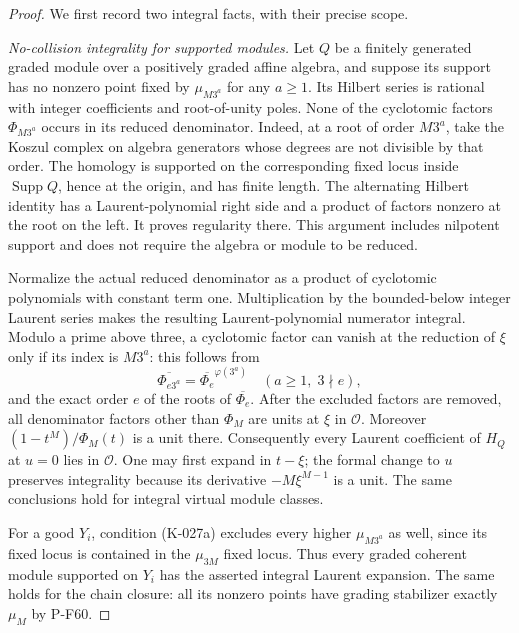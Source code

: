 \begin{proof}
We first record two integral facts, with their precise scope.

\emph{No-collision integrality for supported modules.}
Let $Q$ be a finitely generated graded module over a positively
graded affine algebra, and suppose its support has no nonzero point
fixed by $\mu_{M3^a}$ for any $a\ge1$.  Its Hilbert series is rational
with integer coefficients and root-of-unity poles.  None of the
cyclotomic factors $\Phi_{M3^a}$ occurs in its reduced denominator.
Indeed, at a root of order $M3^a$, take the Koszul complex on algebra
generators whose degrees are not divisible by that order.  The
homology is supported on the corresponding fixed locus inside
$\operatorname{Supp}Q$, hence at the origin, and has finite length.
The alternating Hilbert identity has a Laurent-polynomial right side and a
product of factors nonzero at the root on the left.  It proves
regularity there.  This argument includes nilpotent support and does
not require the algebra or module to be reduced.

Normalize the actual reduced denominator as a product of cyclotomic
polynomials with constant term one.  Multiplication by the bounded-below
integer Laurent series makes the resulting Laurent-polynomial numerator
integral.
Modulo a prime above three, a cyclotomic factor can vanish at the
reduction of $\xi$ only if its index is $M3^a$: this follows from
\[
 \overline{\Phi_{e3^a}}
   =\overline{\Phi_e}^{\varphi(3^a)}\quad(a\ge1,\;3\nmid e),
\]
and the exact order $e$ of the roots of $\overline{\Phi_e}$.
After the excluded factors are removed, all denominator factors
other than $\Phi_M$ are units at $\xi$ in $\mathcal O$.
Moreover $(1-t^M)/\Phi_M(t)$ is a unit there.  Consequently every
Laurent coefficient of $H_Q$ at $u=0$ lies in $\mathcal O$.
One may first expand in $t-\xi$; the formal change to $u$ preserves
integrality because its derivative $-M\xi^{M-1}$ is a unit.
The same conclusions hold for integral virtual module classes.

For a good $Y_i$, condition (K-027a) excludes every higher
$\mu_{M3^a}$ as well, since its fixed locus is contained in the
$\mu_{3M}$ fixed locus.  Thus every graded coherent module supported
on $Y_i$ has the asserted integral Laurent expansion.  The same
holds for the chain closure: all its nonzero points have grading
stabilizer exactly $\mu_M$ by P-F60.


\end{proof}
